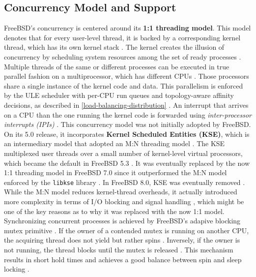 \subsection{Concurrency Model and Support} \label{concurrency-model} %

FreeBSD's concurrency is centered around its \textbf{1:1 threading model}. This model denotes that for every user-level
thread, it is backed by a corresponding kernel thread, which has its own kernel stack \parencite{mckusick2014_process}. The
kernel creates the illusion of concurrency by scheduling system resources among the set of ready processes
\parencite{mckusick2014_process}. Multiple threads of the same or different processes can be executed in true parallel fashion
on a multiprocessor, which has different CPUs \parencite{mckusick2014_process}. Those processors share a single instance of
the kernel code and data. This parallelism is enforced by the ULE scheduler with per-CPU run queues and topology-aware
affinity decisions, as described in \ref{load-balancing-distribution} \parencite{freebsd_smp_handbook}. An interrupt
that arrives on a CPU than the one running the kernel code is forwarded using \textit{inter-processor interrupts (IPIs)}
\parencite{freebsd_smp_handbook}. This concurrency model was not initially adopted by FreeBSD. On its 5.0 release, it
incorporates \textbf{Kernel Scheduled Entities (KSE)}, which is an intermediary model that adopted an M:N threading
model \parencite{freebsd_libthr}. The KSE multiplexed user threads over a small number of kernel-level virtual processors,
which became the default in FreeBSD 5.3 \parencite{freebsd_libthr}. It was eventually replaced by the now 1:1 threading
model in FreeBSD 7.0 since it outperformed the M:N model enforced by the \texttt{libkse} library \parencite{freebsd_libthr}.
In FreeBSD 8.0, KSE was eventually removed \parencite{freebsd_libthr}. While the M:N model reduces kernel-thread overheads,
it actually introduced more complexity in terms of I/O blocking and signal handling \parencite{freebsd_libthr}, which
might be one of the key reasons as to why it was replaced with the now 1:1 model. Synchronizing concurrent processes
is achieved by FreeBSD's adapive blocking mutex primitive \parencite{freebsd_locking}. If the owner of a contended mutex
is running on another CPU, the acquiring thread does not yield but rather spins \parencite{freebsd_locking}. Inversely,
if the owner is not running, the thread blocks until the mutex is released \parencite{freebsd_locking}. This mechanism
results in short hold times and achieves a good balance between spin and sleep locking \parencite{freebsd_locking}.

